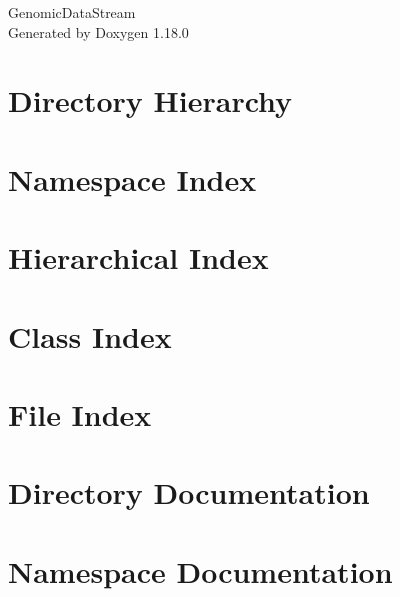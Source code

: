 \documentclass[twoside]{book}
\newcommand{\+}{\discretionary{\mbox{\scriptsize$\hookleftarrow$}}{}{}}
\newcommand{\clearemptydoublepage}{%
    \newpage{\pagestyle{empty}\cleardoublepage}%
  }
\begin{document}
  \raggedbottom
    \hypersetup{pageanchor=false,
                bookmarksnumbered=true,
                pdfencoding=unicode
               }
  \begin{titlepage}
  \vspace*{7cm}
  \begin{center}%
  {\Large Genomic\+Data\+Stream}\\
  \vspace*{1cm}
  {\large Generated by Doxygen 1.18.0}\\
  \end{center}
  \end{titlepage}
  \clearemptydoublepage
  \tableofcontents
  \clearemptydoublepage
  \hypersetup{pageanchor=true}

\chapter{Directory Hierarchy}

\chapter{Namespace Index}

\chapter{Hierarchical Index}

\chapter{Class Index}

\chapter{File Index}

\chapter{Directory Documentation}



\chapter{Namespace Documentation}

\end{document}
